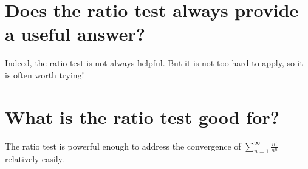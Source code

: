 \documentclass{ximera}
\begin{document}
\begin{question}
\begin{solution}
\begin{hint}
    \end{hint}


    \begin{multiple-choice}
    \end{multiple-choice}
    
  \end{solution}
\end{question}
            

\section{Does the ratio test always provide a useful answer?}

\begin{question}
  \begin{solution}
    \begin{multiple-choice}
    \end{multiple-choice}
  \end{solution}

  Indeed, the ratio test is not always helpful.  But it is not too
  hard to apply, so it is often worth trying!

\end{question}

\section{What is the ratio test good for?}

The ratio test is powerful enough to address the convergence of \(\displaystyle\sum_{n=1}^\infty \frac{n!}{n^n}\) relatively easily.

\end{document}
